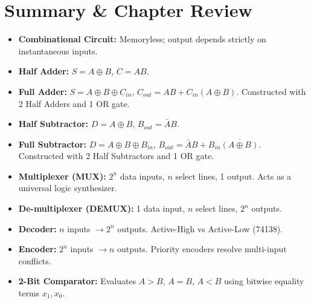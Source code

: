\section{Summary \& Chapter Review}
\begin{quickrevision}
\begin{itemize}
    \item \textbf{Combinational Circuit:} Memoryless; output depends strictly on instantaneous inputs.
    \item \textbf{Half Adder:} $S = A \oplus B$, $C = AB$.
    \item \textbf{Full Adder:} $S = A \oplus B \oplus C_{in}$, $C_{out} = AB + C_{in}(A \oplus B)$. Constructed with 2 Half Adders and 1 OR gate.
    \item \textbf{Half Subtractor:} $D = A \oplus B$, $B_{out} = \bar{A}B$.
    \item \textbf{Full Subtractor:} $D = A \oplus B \oplus B_{in}$, $B_{out} = \bar{A}B + B_{in}\overline{(A \oplus B)}$. Constructed with 2 Half Subtractors and 1 OR gate.
    \item \textbf{Multiplexer (MUX):} $2^n$ data inputs, $n$ select lines, 1 output. Acts as a universal logic synthesizer.
    \item \textbf{De-multiplexer (DEMUX):} 1 data input, $n$ select lines, $2^n$ outputs.
    \item \textbf{Decoder:} $n$ inputs $\rightarrow 2^n$ outputs. Active-High vs Active-Low (74138).
    \item \textbf{Encoder:} $2^n$ inputs $\rightarrow n$ outputs. Priority encoders resolve multi-input conflicts.
    \item \textbf{2-Bit Comparator:} Evaluates $A>B$, $A=B$, $A<B$ using bitwise equality terms $x_1, x_0$.
\end{itemize}
\end{quickrevision}
